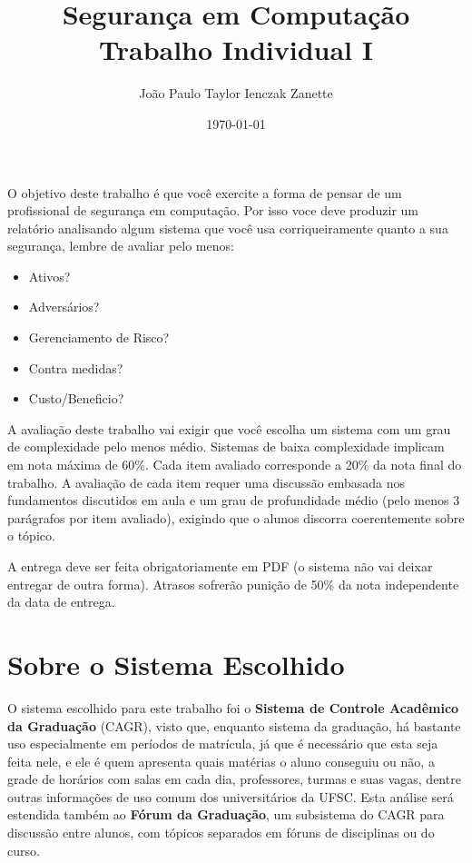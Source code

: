 \documentclass{article}
\title{
    Segurança em Computação \\
    Trabalho Individual I
}
\author{João Paulo Taylor Ienczak Zanette}
\date{\today}
\begin{document}
    \maketitle{}

    \begin{superframe}
        O objetivo deste trabalho é que você exercite a forma de pensar de um
        profissional de segurança em computação. Por isso voce deve produzir um
        relatório analisando algum sistema que você usa corriqueiramente quanto
        a sua segurança, lembre de avaliar pelo menos:

        \begin{itemize}
            \item Ativos?
            \item Adversários?
            \item Gerenciamento de Risco?
            \item Contra medidas?
            \item Custo/Beneficio?
        \end{itemize}

        A avaliação deste trabalho vai exigir que você escolha um sistema com
        um grau de complexidade pelo menos médio. Sistemas de baixa
        complexidade implicam em nota máxima de 60\%. Cada item avaliado
        corresponde a 20\% da nota final do trabalho. A avaliação de cada item
        requer uma discussão embasada nos fundamentos discutidos em aula e um
        grau de profundidade médio (pelo menos 3 parágrafos por item avaliado),
        exigindo que o alunos discorra coerentemente sobre o tópico.

        A entrega deve ser feita obrigatoriamente em PDF (o sistema não vai
        deixar entregar de outra forma). Atrasos sofrerão punição de 50\% da
        nota independente da data de entrega.
    \end{superframe}

    \section{Sobre o Sistema Escolhido}

    O sistema escolhido para este trabalho foi o \textbf{Sistema de Controle
    Acadêmico da Graduação} (CAGR), visto que, enquanto sistema da graduação,
    há bastante uso especialmente em períodos de matrícula, já que é necessário
    que esta seja feita nele, e ele é quem apresenta quais matérias o aluno
    conseguiu ou não, a grade de horários com salas em cada dia, professores,
    turmas e suas vagas, dentre outras informações de uso comum dos
    universitários da UFSC\@. Esta análise será estendida também ao
    \textbf{Fórum da Graduação}, um subsistema do CAGR para discussão entre
    alunos, com tópicos separados em fóruns de disciplinas ou do curso.
\end{document}
